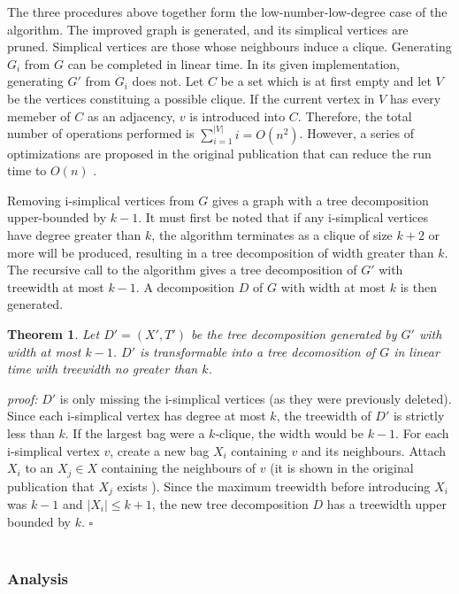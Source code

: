 \documentclass[12pt,conference]{IEEEtran}
\theoremstyle{plain}
\newtheorem{theorem}{Theorem}
\begin{document}
The three procedures above together form the low-number-low-degree case of the algorithm. The improved graph is generated, and its simplical vertices are pruned. Simplical vertices are those whose neighbours induce a clique. Generating $G_{i}$ from $G$ can be completed in linear time. In its given implementation, generating $G'$ from $G_{i}$ does not. Let $C$ be a set which is at first empty and let $V$ be the vertices constituing a possible clique. If the current vertex in $V$ has every memeber of $C$ as an adjacency, $v$ is introduced into $C$. Therefore, the total number of operations performed is $\sum_{i=1}^{|V|}i=O(n^{2})$. However, a series of optimizations are proposed in the original publication that can reduce the run time to $O(n)$ \cite{bodlaender-1992}.

Removing i-simplical vertices from $G$ gives a graph with a tree decomposition upper-bounded by $k-1$. It must first be noted that if any i-simplical vertices have degree greater than $k$, the algorithm terminates as a clique of size $k+2$ or more will be produced, resulting in a tree decomposition of width greater than $k$. The recursive call to the algorithm gives a tree decomposition of $G'$ with treewidth at most $k-1$. A decomposition $D$ of $G$ with width at most $k$ is then generated.

\begin{theorem}
Let $D' = (X',T')$ be the tree decomposition generated by $G'$ with width at most $k-1$. $D'$ is transformable into a tree decomosition of $G$ in linear time with treewidth no greater than $k$.
\end{theorem}

\textit{proof:} $D'$ is only missing the i-simplical vertices (as they were previously deleted). Since each i-simplical vertex has degree at most $k$, the treewidth of $D'$ is strictly less than $k$. If the largest bag were a $k$-clique, the width would be $k-1$. For each i-simplical vertex $v$, create a new bag $X_{i}$ containing $v$ and its neighbours. Attach $X_{i}$ to an $X_{j} \in X$ containing the neighbours of $v$ (it is shown in the original publication that $X_{j}$ exists \cite{bodlaender-1992}). Since the maximum treewidth before introducing $X_{i}$ was $k-1$ and $|X_{i}| \leq k+1$, the new tree decomposition $D$ has a treewidth upper bounded by $k$. $\square$
\\
\\
\subsubsection{Analysis}
\end{document}
